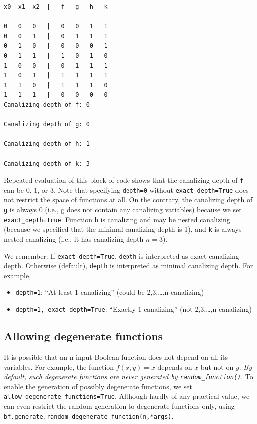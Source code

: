 \documentclass[
]{article}
\providecommand{\tightlist}{%
  \setlength{\itemsep}{0pt}\setlength{\parskip}{0pt}}
\begin{document}
\begin{lstlisting}
x0  x1  x2  |   f   g   h   k
---------------------------------------------------------
0   0   0   |   0   0   1   1
0   0   1   |   0   1   1   1
0   1   0   |   0   0   0   1
0   1   1   |   1   0   1   0
1   0   0   |   0   1   1   1
1   0   1   |   1   1   1   1
1   1   0   |   1   1   1   0
1   1   1   |   0   0   0   0
Canalizing depth of f: 0

Canalizing depth of g: 0

Canalizing depth of h: 1

Canalizing depth of k: 3
\end{lstlisting}

Repeated evaluation of this block of code shows that the canalizing
depth of \texttt{f} can be 0, 1, or 3. Note that specifying
\texttt{depth=0} without \texttt{exact\_depth=True} does not restrict
the space of functions at all. On the contrary, the canalizing depth of
\texttt{g} is always 0 (i.e., g does not contain any canalizing
variables) because we set \texttt{exact\_depth=True}. Function
\texttt{h} is canalizing and may be nested canalizing (because we
specified that the minimal canalizing depth is 1), and \texttt{k} is
always nested canalizing (i.e., it has canalizing depth \(n=3\)).

We remember: If \texttt{exact\_depth=True}, \texttt{depth} is
interpreted as exact canalizing depth. Otherwise (default),
\texttt{depth} is interpreted as minimal canalizing depth. For example,

\begin{itemize}
\tightlist
\item
  \texttt{depth=1}: ``At least 1-canalizing'' (could be
  2,3,\ldots,n-canalizing)
\item
  \texttt{depth=1,\ exact\_depth=True}: ``Exactly 1-canalizing'' (not
  2,3,\ldots,n-canalizing)
\end{itemize}

\subsection{Allowing degenerate
functions}\label{allowing-degenerate-functions}

It is possible that an n-input Boolean function does not depend on all
its variables. For example, the function \(f(x,y) = x\) depends on \(x\)
but not on \(y\). \emph{By default, such degenerate functions are never
generated by \texttt{random\_function()}}. To enable the generation of
possibly degenerate functions, we set
\texttt{allow\_degenerate\_functions=True}. Although hardly of any
practical value, we can even restrict the random generation to
degenerate functions only, using
\texttt{bf.generate.random\_degenerate\_function(n,*args)}.
\end{document}
